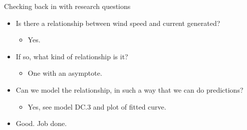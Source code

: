 \documentclass[ignorenonframetext,]{beamer}
\providecommand{\tightlist}{%
  \setlength{\itemsep}{0pt}\setlength{\parskip}{0pt}}
\begin{document}
\begin{frame}{Checking back in with research questions}
\protect\hypertarget{checking-back-in-with-research-questions}{}

\begin{itemize}
\tightlist
\item
  Is there a relationship between wind speed and current generated?

  \begin{itemize}
  \tightlist
  \item
    Yes.
  \end{itemize}
\item
  If so, what kind of relationship is it?

  \begin{itemize}
  \tightlist
  \item
    One with an asymptote.
  \end{itemize}
\item
  Can we model the relationship, in such a way that we can do
  predictions?

  \begin{itemize}
  \tightlist
  \item
    Yes, see model DC.3 and plot of fitted curve.
  \end{itemize}
\item
  Good. Job done.
\end{itemize}

\end{frame}
\end{document}
